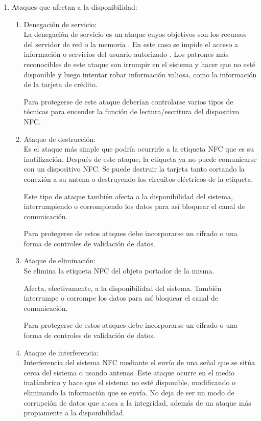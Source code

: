 \documentclass[12pt,a4paper,onecolumn,oneside]{report}
\begin{document}
\begin{enumerate}
\begin{enumerate}
\end{enumerate}


\item Ataques que afectan a la disponibilidad:\\
\begin{enumerate}

\item Denegación de servicio:\\
La denegación de servicio es un ataque cuyos objetivos son los recursos del servidor de red o la memoria \cite{siete}. En este caso se impide el acceso a información o servicios del usuario autorizado \cite{ocho}. Los patrones más reconocibles de este ataque son irrumpir en el sistema y hacer que no esté disponible y luego intentar robar información valiosa, como la información de la tarjeta de crédito.

Para protegerse de este ataque deberían controlarse varios tipos de técnicas para encender la función de lectura/escritura del dispositivo NFC.

\item Ataque de destrucción:\\
Es el ataque más simple que podría ocurrirle a la etiqueta NFC que es su inutilización. Después de este ataque, la etiqueta ya no puede comunicarse con un dispositivo NFC. Se puede destruir la tarjeta tanto cortando la conexión a su antena o destruyendo los circuitos eléctricos de la etiqueta. 

Este tipo de ataque también afecta a la disponibilidad del sistema, interrumpiendo o corrompiendo los datos para así bloquear el canal de comunicación.

Para protegerse de estos ataques debe incorporarse un cifrado o una forma de controles de validación de datos.

\item Ataque de eliminación:\\
Se elimina la etiqueta NFC del objeto portador de la misma. 

Afecta, efectivamente, a la disponibilidad del sistema. También  interrumpe o corrompe los datos para así bloquear el canal de comunicación.

Para protegerse de estos ataques debe incorporarse un cifrado o una forma de controles de validación de datos.

\item Ataque de interferencia:\\
Interferencia del sistema NFC mediante el envío de una señal que se sitúa cerca del sistema o usando antenas. Este ataque ocurre en el medio inalámbrico y hace que el sistema no esté disponible, modificando o eliminando la información que se envía. No deja de ser un modo de corrupción de datos que ataca a la integridad, además de un ataque más propiamente a la disponibilidad.


\end{enumerate}
\end{enumerate}
\end{document}
